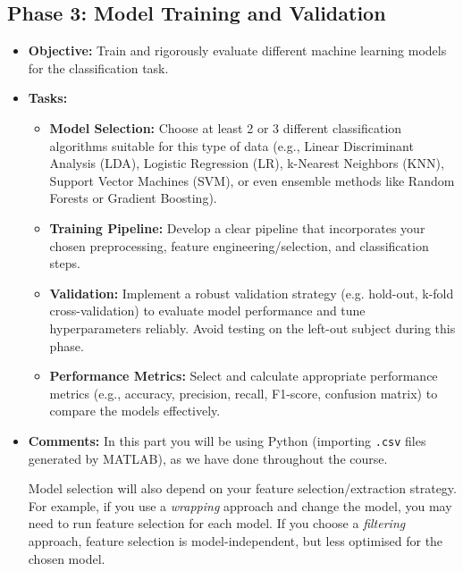 \documentclass[11pt]{exam}
\begin{document}
    \subsection{Phase 3: Model Training and Validation} %
    \begin{itemize}
        \item \textbf{Objective:} Train and rigorously evaluate different machine learning models for the classification task.
        \item \textbf{Tasks:}
        \begin{itemize}
            \item \textbf{Model Selection:} Choose at least 2 or 3 different classification algorithms suitable for this type of data (e.g., Linear Discriminant Analysis (LDA), Logistic Regression (LR), k-Nearest Neighbors (KNN), Support Vector Machines (SVM), or even ensemble methods like Random Forests or Gradient Boosting).
            \item \textbf{Training Pipeline:} Develop a clear pipeline that incorporates your chosen preprocessing, feature engineering/selection, and classification steps.
            \item \textbf{Validation:} Implement a robust validation strategy (e.g. hold-out, k-fold cross-validation) to evaluate model performance and tune hyperparameters reliably. Avoid testing on the left-out subject during this phase.
            \item \textbf{Performance Metrics:} Select and calculate appropriate performance metrics (e.g., accuracy, precision, recall, F1-score, confusion matrix) to compare the models effectively.
        \end{itemize}
        \item \textbf{Comments:} In this part you will be using Python (importing \texttt{.csv} files generated by MATLAB), as we have done throughout the course.

        Model selection will also depend on your feature selection/extraction strategy. For example, if you use a \emph{wrapping} approach and change the model, you may need to run feature selection for each model. If you choose a \emph{filtering} approach, feature selection is model-independent, but less optimised for the chosen model.


\end{itemize}
\end{document}
